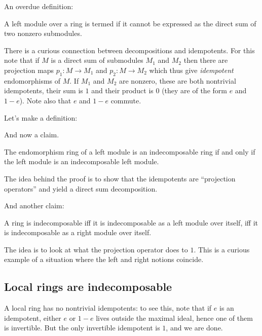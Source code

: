 \documentclass[a4paper]{amsart}
\begin{document}
An overdue definition:

\begin{definer}
  A left module over a ring is termed  if it cannot be expressed as the direct
  sum of two nonzero submodules.
\end{definer}

There is a curious connection between decompositions and
idempotents. For this note that if $M$ is a direct sum of submodules
$M_1$ and $M_2$ then there are projection maps $p_1:M \to M_1$ and
$p_2:M \to M_2$ which thus give {\em idempotent} endomorphisms of $M$.
If $M_1$ and $M_2$ are nonzero, these are both nontrivial idempotents,
their sum is $1$ and their product is $0$ (they are of the form $e$
and $1 - e$). Note also that $e$ and $1-e$ commute.

Let's make a definition:

\begin{definer}
\end{definer}

And now a claim.

\begin{claimer}
  The endomorphism ring of a left module is an indecomposable ring if and only
  if the left module is an indecomposable left module.
\end{claimer}

The idea behind the proof is to show that the idempotents are ``projection operators''
and yield a direct sum decomposition.

And another claim:

\begin{claimer}
  A ring is indecomposable iff it is indecomposable as a left module
  over itself, iff it is indecomposable as a right module over itself.
\end{claimer}

The idea is to look at what the projection operator does to $1$. This
is a curious example of a situation where the left and right notions
coincide.

\subsection{Local rings are indecomposable}

A local ring has no nontrivial idempotents: to see this, note that if
$e$ is an idempotent, either $e$ or $1-e$ lives outside the maximal
ideal, hence one of them is invertible. But the only invertible
idempotent is $1$, and we are done.
\end{document}
